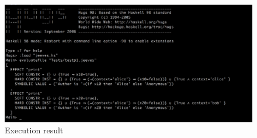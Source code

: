 % 
% 

\begin{figure}[h]
    \centering
    \includegraphics[width=1.0\textwidth]{result.PNG}
    \caption{Execution result}
    \label{fig:result}
\end{figure}



